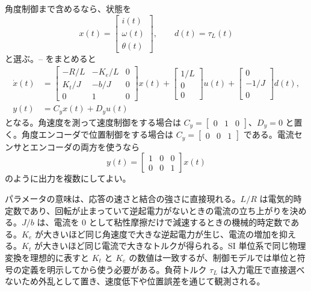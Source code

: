 角度制御まで含めるなら、状態を
\begin{equation}
  x(t)=\begin{bmatrix}i(t)\\ \omega(t)\\ \theta(t)\end{bmatrix},
  \qquad d(t)=\tau_L(t)
\end{equation}
と選ぶ。-- をまとめると
\begin{align}
  \dot{x}(t)
  &=
  \begin{bmatrix}
    -R/L&-K_e/L&0\\
    K_t/J&-b/J&0\\
    0&1&0
  \end{bmatrix}x(t)
  +\begin{bmatrix}
    1/L\\
    0\\
    0
  \end{bmatrix}u(t)
  +\begin{bmatrix}
    0\\
    -1/J\\
    0
  \end{bmatrix}d(t),\label{eq:dcmotor-state-space}\\
  y(t)&=C_y x(t)+D_y u(t)
\end{align}
となる。角速度を測って速度制御をする場合は $C_y=\begin{bmatrix}0&1&0\end{bmatrix}$、$D_y=0$ と置く。角度エンコーダで位置制御をする場合は $C_y=\begin{bmatrix}0&0&1\end{bmatrix}$ である。電流センサとエンコーダの両方を使うなら
\begin{equation}
  y(t)=
  \begin{bmatrix}
    1&0&0\\
    0&0&1
  \end{bmatrix}x(t)
\end{equation}
のように出力を複数にしてよい。

パラメータの意味は、応答の速さと結合の強さに直接現れる。$L/R$ は電気的時定数であり、回転が止まっていて逆起電力がないときの電流の立ち上がりを決める。$J/b$ は、電流を 0 として粘性摩擦だけで減速するときの機械的時定数である。$K_e$ が大きいほど同じ角速度で大きな逆起電力が生じ、電流の増加を抑える。$K_t$ が大きいほど同じ電流で大きなトルクが得られる。SI 単位系で同じ物理変換を理想的に表すと $K_t$ と $K_e$ の数値は一致するが、制御モデルでは単位と符号の定義を明示してから使う必要がある。負荷トルク $\tau_L$ は入力電圧で直接選べないため外乱として置き、速度低下や位置誤差を通じて観測される。

